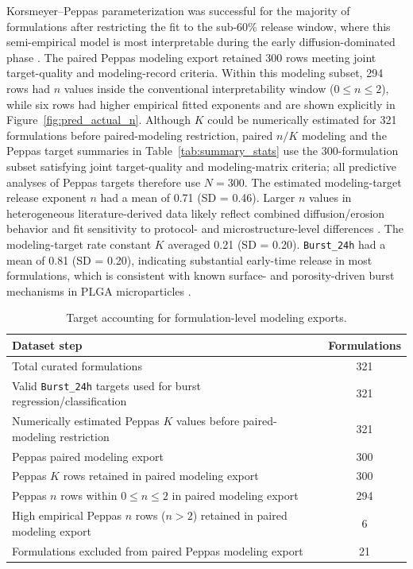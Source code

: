 \documentclass[preprint,12pt,authoryear]{elsarticle}
\begin{document}
Korsmeyer--Peppas parameterization was successful for the majority of formulations after restricting the fit to the sub-60\% release window, where this semi-empirical model is most interpretable during the early diffusion-dominated phase \citep{Korsmeyer1983, RitgerPeppas1987}. The paired Peppas modeling export retained 300 rows meeting joint target-quality and modeling-record criteria. Within this modeling subset, 294 rows had $n$ values inside the conventional interpretability window ($0 \le n \le 2$), while six rows had higher empirical fitted exponents and are shown explicitly in Figure~\ref{fig:pred_actual_n}. Although $K$ could be numerically estimated for 321 formulations before paired-modeling restriction, paired $n/K$ modeling and the Peppas target summaries in Table~\ref{tab:summary_stats} use the 300-formulation subset satisfying joint target-quality and modeling-matrix criteria; all predictive analyses of Peppas targets therefore use $N=300$. The estimated modeling-target release exponent $n$ had a mean of 0.71 (SD = 0.46). Larger $n$ values in heterogeneous literature-derived data likely reflect combined diffusion/erosion behavior and fit sensitivity to protocol- and microstructure-level differences \citep{RitgerPeppas1987, Fredenberg2011, Klose2011Sink}. The modeling-target rate constant $K$ averaged 0.21 (SD = 0.20). \texttt{Burst\_24h} had a mean of 0.81 (SD = 0.20), indicating substantial early-time release in most formulations, which is consistent with known surface- and porosity-driven burst mechanisms in PLGA microparticles \citep{Yoo2020Burst, Fredenberg2011, KloseSiepmann2006Porosity}.

\begin{table}[H]
\centering
\caption{Target accounting for formulation-level modeling exports.}
\label{tab:target_accounting}
\begin{tabularx}{\linewidth}{X c}
\toprule
Dataset step & Formulations \\
\midrule
Total curated formulations & 321 \\
Valid \texttt{Burst\_24h} targets used for burst regression/classification & 321 \\
Numerically estimated Peppas $K$ values before paired-modeling restriction & 321 \\
Peppas paired modeling export & 300 \\
Peppas $K$ rows retained in paired modeling export & 300 \\
Peppas $n$ rows within $0 \le n \le 2$ in paired modeling export & 294 \\
High empirical Peppas $n$ rows ($n>2$) retained in paired modeling export & 6 \\
Formulations excluded from paired Peppas modeling export & 21 \\
\bottomrule
\end{tabularx}
\end{table}
\end{document}
